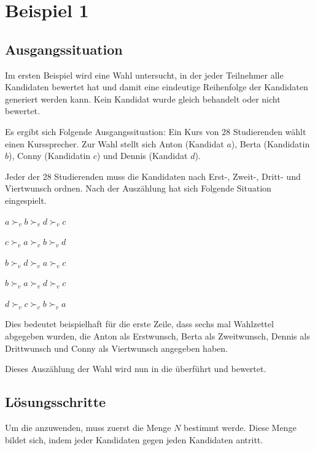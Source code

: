 \section{Beispiel 1}
\label{sec:beispiel1}


\subsection{Ausgangssituation} 
\label{sec:ausgangssituation1}
Im ersten Beispiel wird eine Wahl untersucht, in der jeder Teilnehmer alle Kandidaten bewertet hat und damit eine eindeutige Reihenfolge der Kandidaten generiert werden kann. Kein Kandidat wurde gleich behandelt oder nicht bewertet.

Es ergibt sich Folgende Ausgangssituation:
Ein Kurs von 28 Studierenden wählt einen Kurssprecher. Zur Wahl stellt sich Anton (Kandidat $a$), Berta (Kandidatin $b$), Conny (Kandidatin $c$) und Dennis (Kandidat $d$).

Jeder der 28 Studierenden muss die Kandidaten nach Erst-, Zweit-, Dritt- und Viertwunsch ordnen. Nach der Auszählung hat sich Folgende Situation eingespielt. 

\begin{description}
\centering
\item[6 mal] $a \succ_{v} b \succ_{v} d \succ_{v}c$
\item[4 mal] $c \succ_{v} a \succ_{v} b \succ_{v}d$
\item[10 mal] $b \succ_{v} d \succ_{v} a \succ_{v}c$
\item[3 mal] $b \succ_{v} a \succ_{v} d \succ_{v}c$
\item[5 mal] $d \succ_{v} c \succ_{v} b \succ_{v}a$
\end{description}

Dies bedeutet beispielhaft für die erste Zeile, dass sechs mal Wahlzettel abgegeben wurden, die Anton als Erstwunsch, Berta als Zweitwunsch, Dennis als Drittwunsch und Conny als Viertwunsch angegeben haben.

Dieses Auszählung der Wahl wird nun in die \schulze überführt und bewertet.
\newpage
\subsection{Lösungsschritte} 
\label{sec:loesungen1}
Um die \schulze anzuwenden, muss zuerst die Menge $N$ bestimmt werde. Diese Menge bildet sich, indem jeder Kandidaten gegen jeden Kandidaten antritt.

